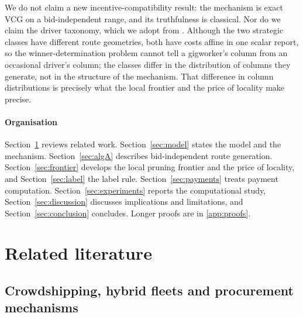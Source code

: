 \documentclass[review,12pt]{elsarticle}
\theoremstyle{definition}
\theoremstyle{remark}
\begin{document}
We do not claim a new incentive-compatibility result: the mechanism is
exact VCG on a bid-independent range, and its truthfulness is classical.
Nor do we claim the driver taxonomy, which we adopt from
\citet{luy2024workforce}. Although the two strategic classes have
different route geometries, both have costs affine in one scalar report,
so the winner-determination problem cannot tell a gigworker's column from
an occasional driver's column; the classes differ in the distribution of
columns they generate, not in the structure of the mechanism. That
difference in column distributions is precisely what the local frontier
and the price of locality make precise.

\paragraph{Organisation} Section~\ref{sec:lit} reviews related work.
Section~\ref{sec:model} states the model and the mechanism.
Section~\ref{sec:algA} describes bid-independent route generation.
Section~\ref{sec:frontier} develops the local pruning frontier and the
price of locality, and Section~\ref{sec:label} the label rule.
Section~\ref{sec:payments} treats payment computation.
Section~\ref{sec:experiments} reports the computational study,
Section~\ref{sec:discussion} discusses implications and limitations, and
Section~\ref{sec:conclusion} concludes. Longer proofs are in
\ref{app:proofs}.

\section{Related literature}
\label{sec:lit}

\subsection{Crowdshipping, hybrid fleets and procurement mechanisms}
\end{document}
